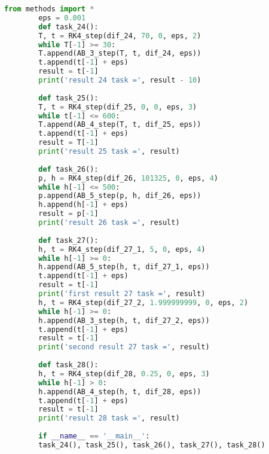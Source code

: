\documentclass[a4paper,fleqn,14pt,titlepage]{extarticle}
\begin{document}
	\newpage
	\begin{lstlisting}[language=Python, caption=Файл <<main.py>> с решением дифференциальных уравнений для наших задач]
		from methods import *
		eps = 0.001
		def task_24():
		T, t = RK4_step(dif_24, 70, 0, eps, 2)
		while T[-1] >= 30:
		T.append(AB_3_step(T, t, dif_24, eps))
		t.append(t[-1] + eps)
		result = t[-1]
		print('result 24 task =', result - 10)
		
		def task_25():
		T, t = RK4_step(dif_25, 0, 0, eps, 3)
		while t[-1] <= 600:
		T.append(AB_4_step(T, t, dif_25, eps))
		t.append(t[-1] + eps)
		result = T[-1]
		print('result 25 task =', result)
		
		def task_26():
		p, h = RK4_step(dif_26, 101325, 0, eps, 4)
		while h[-1] <= 500:
		p.append(AB_5_step(p, h, dif_26, eps))
		h.append(h[-1] + eps)
		result = p[-1]
		print('result 26 task =', result)
		
		def task_27():
		h, t = RK4_step(dif_27_1, 5, 0, eps, 4)
		while h[-1] >= 0:
		h.append(AB_5_step(h, t, dif_27_1, eps))
		t.append(t[-1] + eps)
		result = t[-1]
		print('first result 27 task =', result)
		h, t = RK4_step(dif_27_2, 1.999999999, 0, eps, 2)
		while h[-1] >= 0:
		h.append(AB_3_step(h, t, dif_27_2, eps))
		t.append(t[-1] + eps)
		result = t[-1]
		print('second result 27 task =', result)
		
		def task_28():
		h, t = RK4_step(dif_28, 0.25, 0, eps, 3)
		while h[-1] > 0:
		h.append(AB_4_step(h, t, dif_28, eps))
		t.append(t[-1] + eps)
		result = t[-1]
		print('result 28 task =', result)
		
		if __name__ == '__main__':
		task_24(), task_25(), task_26(), task_27(), task_28()
	\end{lstlisting}
\end{document}
